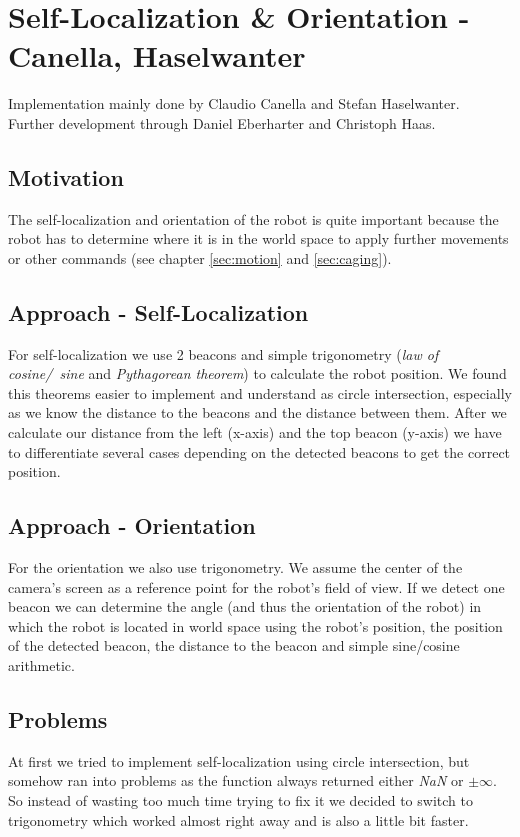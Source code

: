 \documentclass[703031]{iisreport}
\begin{document}
\section{Self-Localization \& Orientation -\\ Canella, Haselwanter}
\label{sec:localization}
Implementation mainly done by Claudio Canella and Stefan Haselwanter. \\
Further development through Daniel Eberharter and Christoph Haas.

\subsection{Motivation}
The self-localization and orientation of the robot is quite important because the robot has to determine where it is in the world space to apply further movements or other commands (see chapter \ref{sec:motion} and \ref{sec:caging}).

\subsection{Approach - Self-Localization}
For self-localization we use 2 beacons and simple trigonometry (\emph{law of \mbox{cosine}/\ sine} and \emph{Pythagorean theorem}) to calculate the robot position. We found this theorems easier to implement and understand as circle intersection, especially as we know the distance to the beacons and the distance between them. After we calculate our distance from the left (x-axis) and the top beacon (y-axis) we have to differentiate several cases depending on the detected beacons to get the correct position.

\subsection{Approach - Orientation}
For the orientation we also use trigonometry. We assume the center of the camera's screen as a reference point for the robot's field of view. If we detect one beacon we can determine the angle (and thus the orientation of the robot) in which the robot is located in world space using the robot's position, the position of the detected beacon, the distance to the beacon and simple sine/cosine arithmetic.

\subsection{Problems}
At first we tried to implement self-localization using circle intersection, but somehow ran into problems as the function always returned either \emph{NaN} or $\pm \infty$. So instead of wasting too much time trying to fix it we decided to switch to trigonometry which worked almost right away and is also a little bit faster.
\end{document}

